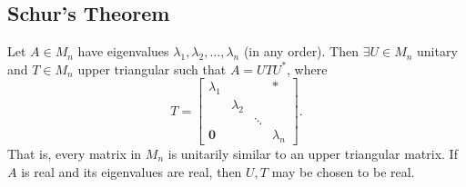 \subsection{Schur's Theorem}
\begin{theorem}[Schur]
\label{thm:schurs-thm}
Let $A \in M_n$ have eigenvalues $\lambda_1, \lambda_2, \dots, \lambda_n$ (in any order). Then $\exists U \in M_n$ unitary and $T \in M_n$ upper triangular such that $A = UTU^*$, where 
$$T = \begin{bmatrix}\lambda_1 & & & * \\
                & \lambda_2 & &  \\ 
                & & \ddots & \\
                \mathbf{0} & & & \lambda_n \end{bmatrix}.
$$ 
That is, every matrix in $M_n$ is unitarily similar to an upper triangular matrix. If $A$ is real and its eigenvalues are real, then $U, T$ may be chosen to be real.
\end{theorem}

